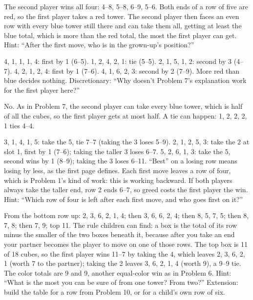  The second player wins all four: 4--8, 5--8, 6--9, 5--6. Both ends of a row of five are red, so the first player takes a red tower. The second player then faces an even row with every blue tower still there and can take them all, getting at least the blue total, which is more than the red total, the most the first player can get. Hint: ``After the first move, who is in the grown-up's position?''

 4, 1, 1, 1, 4: first by 1 (6--5). 1, 2, 4, 2, 1: tie (5--5). 2, 1, 5, 1, 2: second by 3 (4--7). 4, 2, 1, 2, 4: first by 1 (7--6). 4, 1, 6, 2, 3: second by 2 (7--9). More red than blue decides nothing. Discretionary: ``Why doesn't Problem 7's explanation work for the first player here?''

 No. As in Problem 7, the second player can take every blue tower, which is half of all the cubes, so the first player gets at most half. A tie can happen: 1, 2, 2, 2, 1 ties 4--4.

 3, 1, 4, 1, 5: take the 5, tie 7--7 (taking the 3 loses 5--9). 2, 1, 2, 5, 3: take the 2 at slot 1, first by 1 (7--6); taking the taller 3 loses 6--7. 5, 2, 6, 1, 3: take the 5, second wins by 1 (8--9); taking the 3 loses 6--11. ``Best'' on a losing row means losing by less, as the first page defines. Each first move leaves a row of four, which is Problem 1's kind of work: this is working backward. If both players always take the taller end, row 2 ends 6--7, so greed costs the first player the win. Hint: ``Which row of four is left after each first move, and who goes first on it?''

 From the bottom row up: 2, 3, 6, 2, 1, 4; then 3, 6, 6, 2, 4; then 8, 5, 7, 5; then 8, 7, 8; then 7, 9; top 11. The rule children can find: a box is the total of its row minus the smaller of the two boxes beneath it, because after you take an end your partner becomes the player to move on one of those rows. The top box is 11 of 18 cubes, so the first player wins 11--7 by taking the 4, which leaves 2, 3, 6, 2, 1 (worth 7 to the partner); taking the 2 leaves 3, 6, 2, 1, 4 (worth 9), a 9--9 tie. The color totals are 9 and 9, another equal-color win as in Problem 6. Hint: ``What is the most you can be sure of from one tower? From two?'' Extension: build the table for a row from Problem 10, or for a child's own row of six.

